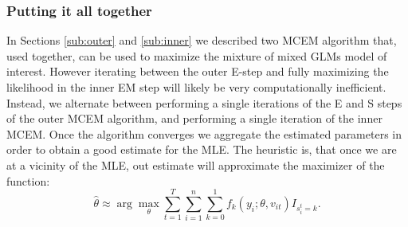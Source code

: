 \documentclass{article}\usepackage[]{graphicx}\usepackage[]{color}
\begin{document}
\subsubsection{Putting it all together}
In Sections \ref{sub:outer} and \ref{sub:inner} we described two MCEM algorithm that, used together, can be used to maximize the mixture of mixed GLMs model of interest. However iterating between the outer E-step and fully maximizing the likelihood in the inner EM step will likely be very computationally inefficient. Instead, we alternate between performing a single iterations of the E and S steps of the outer MCEM algorithm, and performing a single iteration of the inner MCEM. Once the algorithm converges we aggregate the estimated parameters in order to obtain a good estimate for the MLE. The heuristic is, that once we are at a vicinity of the MLE, out estimate will approximate the maximizer of the function:
$$
\hat\theta 
\approx \arg\max_{\theta} \sum_{t=1}^{T} \sum_{i=1}^{n}  \sum_{k=0}^{1} f_k(y_i;\theta, v_{it}) I_{s_i^t = k}.
$$
\end{document}
